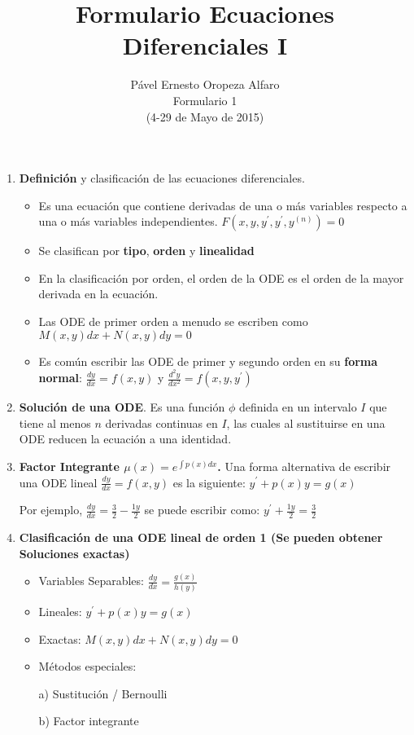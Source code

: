 \documentclass[twoside, twocolumn, 10pt]{article}
\title{Formulario Ecuaciones Diferenciales I}
\author{P\'avel Ernesto Oropeza Alfaro \\Formulario 1 \\(4-29 de Mayo de 2015)}
\begin{document}
\date{ }
\maketitle
\thispagestyle{empty}
{\begin{small}
\begin{enumerate}
    \item \textbf{Definición} y clasificación de las ecuaciones diferenciales. 
\begin{itemize}
    \item Es una ecuación que contiene derivadas de una o más 
        variables respecto a una o más variables independientes.
        $F(x,y, y^{\prime},y^{\prime},y^{(n)})=0$
    \item Se clasifican por \textbf{tipo}, \textbf{orden} y \textbf{linealidad}
    \item En la clasificación por orden, el orden de la ODE es el orden de la
        mayor derivada en la ecuación.
    \item Las ODE de primer orden a menudo se escriben como 
        $M(x,y)dx + N(x,y) dy = 0$
    \item Es común escribir las ODE de primer y segundo orden en su \textbf{forma normal}:
        $\frac{dy}{dx}=f(x,y)$ y $\frac{d^{2}y}{dx^{2}}=f(x,y,y^{\prime})$
\end{itemize}

\item \textbf{Solución de una ODE}. Es una función $\phi$ definida en un intervalo $I$ que
    tiene al menos $n$ derivadas continuas en $I$, las cuales al sustituirse en
    una ODE reducen la ecuación a una identidad.

\item \textbf{Factor Integrante $\mu(x)=e^{\int p(x) dx}$.} Una forma alternativa de escribir una ODE lineal 
    $\frac{dy}{dx}=f(x,y)$ es la siguiente:
    $y^{\prime} + p(x)y=g(x)$

Por ejemplo, $\frac{dy}{dx}=\frac{3}{2}-\frac{1y}{2}$ se puede escribir como:
$y^{\prime} + \frac{1y}{2}=\frac{3}{2}$
\item \textbf{Clasificación de una ODE lineal de orden 1 (Se pueden obtener Soluciones exactas)}
\begin{itemize}
    \item Variables Separables: $\frac{dy}{dx}=\frac{g(x)}{h(y)}$
    \item Lineales: $y^{\prime} + p(x)y=g(x)$
    \item Exactas: $M(x,y)dx + N(x,y) dy = 0$
    \item Métodos especiales:
    \item [a)] Sustitución / Bernoulli
    \item [b)] Factor integrante
\end{itemize} 


\end{enumerate}
\end{small}}
\end{document}

